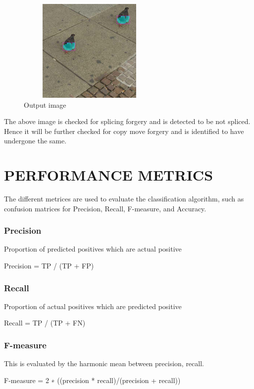  
\begin{figure}[htp]
\centering
\includegraphics[width=7cm,height=5cm]{Figures/cmf_analyzed.jpg}
\caption{Output image}
\label{fig:lion}
\end{figure}
The above image is checked for splicing forgery and is detected to be not spliced. Hence it will be further checked for copy move forgery and is identified to have undergone the same.

\newpage
\section{PERFORMANCE METRICS}
The different  metrices  are  used  to  evaluate  the classification algorithm,  such  as confusion  matrices  for Precision,  Recall,  F-measure,  and  Accuracy.  
\subsubsection{Precision}

Proportion of predicted positives which are actual positive

         \newline
          Precision  = TP / (TP + FP)
\subsubsection{Recall}

\tab Proportion of actual positives which are predicted positive
        
         \newline
          Recall  = TP / (TP + FN)

\subsubsection{F-measure}

This is evaluated by the harmonic mean between precision, recall.

        \newline
         F-measure =    2 ∗ ((precision * recall)/(precision + recall))
